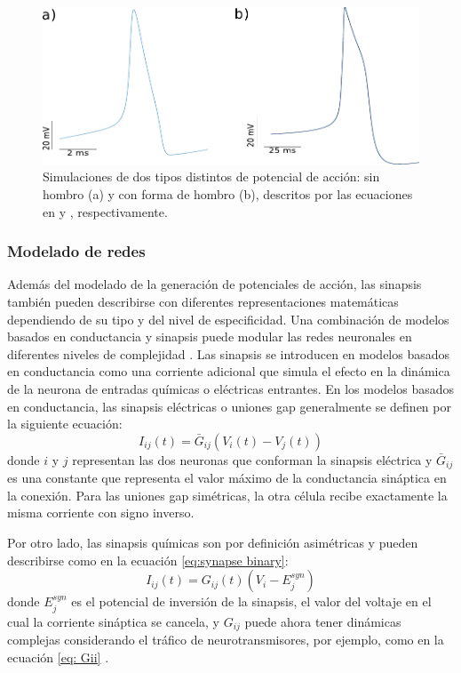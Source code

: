 \begin{figure}[htb!]
	\includegraphics[width=\textwidth]{img/intro/spike-types model.pdf}
	\caption{Simulaciones de dos tipos distintos de potencial de acción: sin hombro (a) y con forma de hombro (b), descritos por las ecuaciones en \textcite{hodgkin_quantitative_1952} y \textcite{vavoulis_balanced_2010}, respectivamente.}
	\label{fig:spike-types model spanish}
\end{figure}

\subsubsection{\large{Modelado de redes}}
\label{c-intro-synapses-spanish}
Además del modelado de la generación de potenciales de acción, las sinapsis también pueden describirse con diferentes representaciones matemáticas dependiendo de su tipo y del nivel de especificidad. Una combinación de modelos basados en conductancia y sinapsis puede modular las redes neuronales en diferentes niveles de complejidad \parencite{aguirre_pattern_2007,latorre_transient_2013,huerta_topology_2001}. Las sinapsis se introducen en modelos basados en conductancia como una corriente adicional que simula el efecto en la dinámica de la neurona de entradas químicas o eléctricas entrantes. En los modelos basados en conductancia, las sinapsis eléctricas o uniones gap generalmente se definen por la siguiente ecuación:
\begin{equation}
    I_{ij}(t) = \bar{G}_{ij} (V_i(t) - V_j(t))
\end{equation}
\noindent donde $i$ y $j$ representan las dos neuronas que conforman la sinapsis eléctrica y $\bar{G}_{ij}$ es una constante que representa el valor máximo de la conductancia sináptica en la conexión. Para las uniones gap simétricas, la otra célula recibe exactamente la misma corriente con signo inverso.

Por otro lado, las sinapsis químicas son por definición asimétricas y pueden describirse como en la ecuación \ref{eq:synapse binary}:
\begin{equation}
     I_{ij}(t) = G_{ij}(t) (V_i - E_j^{syn})
     \label{eq:synapse binary spanish}
\end{equation}
\noindent donde $E_j^{syn}$ es el potencial de inversión de la sinapsis, el valor del voltaje en el cual la corriente sináptica se cancela, y $G_{ij}$ puede ahora tener dinámicas complejas considerando el tráfico de neurotransmisores, por ejemplo, como en la ecuación \ref{eq: Gii} \parencite{torres_modeling_2012}. 

